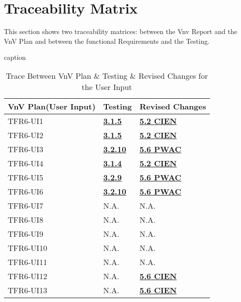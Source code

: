 \documentclass[12pt, titlepage]{article}
\begin{document}
\section{Traceability Matrix} \label{SecTM}

This section shows two traceability matrices: between the Vnv Report and the VnV Plan
 and between the functional Requirements and the Testing.

\begin{table}[H]
\centering
\caption{caption}
\begin{tabular}{p{} p{} p{}}
\toprule
\textbf{VnV Plan(User Input)} & \textbf{Testing} & \textbf{Revised Changes}\\
\midrule
TFR6-UI1 &  \hyperref[3.1.5]{\textbf{3.1.5}} & \hyperref[CIEN]{\textbf{5.2 CIEN}}\\
TFR6-UI2 & \hyperref[3.1.5]{\textbf{3.1.5}} &  \hyperref[CIEN]{\textbf{5.2 CIEN}}\\
TFR6-UI3 & \hyperref[3.2.10]{\textbf{3.2.10}} &  \hyperref[PWAC]{\textbf{5.6 PWAC}}\\
TFR6-UI4 & \hyperref[3.1.4]{\textbf{3.1.4}} &  \hyperref[CIEN]{\textbf{5.2 CIEN}}\\
TFR6-UI5 & \hyperref[3.2.9]{\textbf{3.2.9}} &  \hyperref[PWAC]{\textbf{5.6 PWAC}}\\
TFR6-UI6 & \hyperref[3.2.10]{\textbf{3.2.10}} &  \hyperref[PWAC]{\textbf{5.6 PWAC}}\\
TFR6-UI7 & N.A. &  N.A.\\
TFR6-UI8 & N.A. &  N.A.\\
TFR6-UI9 & N.A. &  N.A.\\
TFR6-UI10 & N.A.  & N.A.\\
TFR6-UI11 & N.A. & N.A.\\
TFR6-UI12 & N.A. & \hyperref[CIEN]{\textbf{5.6 CIEN}}\\
TFR6-UI13 & N.A. & \hyperref[CIEN]{\textbf{5.6 CIEN}}\\
\bottomrule
\end{tabular}
\caption{Trace Between VnV Plan \& Testing \& Revised Changes for the User Input}
\label{TblRT}
\end{table}
\end{document}
